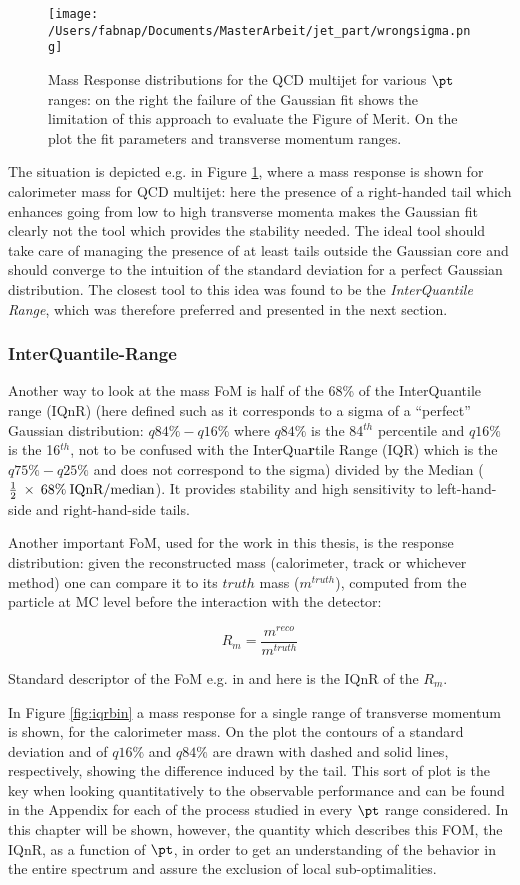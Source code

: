 \begin{figure}[!ht]
  \centering
      \texttt{[image: /Users/fabnap/Documents/MasterArbeit/jet\_part/wrongsigma.png]}
  \caption[Gaussian fit for QCD multijet]{Mass Response distributions for the QCD multijet for various $\pt$ ranges: on the right the failure of the Gaussian fit shows the limitation of this approach to evaluate the Figure of Merit. On the plot the fit parameters and transverse momentum ranges.}
  \label{fig:wrongsigma32}
\end{figure}

The situation is depicted e.g. in Figure \ref{fig:wrongsigma32}, where a mass response is shown for calorimeter mass for QCD multijet: here the presence of a right-handed tail which enhances going from low to high transverse momenta makes the Gaussian fit clearly not the tool which provides the stability needed. The ideal tool should take care of managing the presence of at least tails outside the Gaussian core and should converge to the intuition of the standard deviation for a perfect Gaussian distribution.
The closest tool to this idea was found to be the \textit{InterQuantile Range}, which was therefore preferred and presented in the next section.

\subsubsection{InterQuantile-Range}
Another way to look at the mass FoM is half of the 68\% of the InterQuantile range (IQnR) (here defined such as it corresponds to a sigma of a ``perfect'' Gaussian distribution: $q84\%-q16\%$ where $q84\%$ is the 84$^{th}$ percentile and $q16\%$ is the 16$^{th}$, not to be confused with the InterQua\textbf{r}tile Range (IQR) which is the $q75\%-q25\%$ and does not correspond to the sigma) divided by the Median ($\frac{1}{2}\: \times\: 68\% \:\textrm{IQnR/median}$). It provides stability and high sensitivity to left-hand-side and right-hand-side tails.

Another important FoM, used for the work in this thesis, is the response distribution: given the reconstructed mass (calorimeter, track or whichever method) one can compare it to its $truth$ mass ($m^{truth}$), computed from the particle at MC level before the interaction with the detector:

$$R_m=\frac{m^{reco}}{m^{truth}}$$

Standard descriptor of the FoM e.g. in \cite{art35} and here is the IQnR of the $R_m$.
  
  
In Figure \ref{fig:iqrbin} a mass response for a single range of transverse momentum is shown, for the calorimeter mass. On the plot the contours of a standard deviation and of $q16\%$ and $q84\%$ are drawn with dashed and solid lines, respectively, showing the difference induced by the tail. This sort of plot is the key when looking quantitatively to the observable performance and can be found in the Appendix for each of the process studied in every $\pt$ range considered. In this chapter will be shown, however, the quantity which describes this FOM, the IQnR, as a function of $\pt$, in order to get an understanding of the behavior in the entire spectrum and assure the exclusion of local sub-optimalities.

